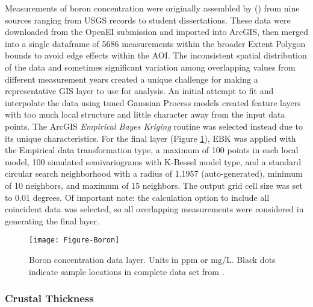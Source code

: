 Measurements of boron concentration were originally assembled by \citeauthor{bielicki_hydrogeolgic_2015} (\citeyear{bielicki_hydrogeolgic_2015}) from nine sources ranging from USGS records to student dissertations. These data were downloaded from the OpenEI submission \citep{kelley_geothermal_2015} and imported into ArcGIS, then merged into a single dataframe of 5686 measurements within the broader Extent Polygon bounds to avoid edge effects within the AOI. The inconsistent spatial distribution of the data and sometimes significant variation among overlapping values from different measurement years created a unique challenge for making a representative GIS layer to use for analysis. An initial attempt to fit and interpolate the data using tuned Gaussian Process models created feature layers with too much local structure and little character away from the input data points. The ArcGIS \textit{Empirical Bayes Kriging} routine was selected instead due to its unique characteristics. For the final layer (Figure \ref{fig:feat_boron}), EBK was applied with the Empirical data transformation type, a maximum of 100 points in each local model, 100 simulated semivariograms with K-Bessel model type, and a standard circular search neighborhood with a radius of 1.1957 (auto-generated), minimum of 10 neighbors, and maximum of 15 neighbors. The output grid cell size was set to 0.01 degrees. Of important note: the calculation option to include all coincident data was selected, so all overlapping measurements were considered in generating the final layer.

\begin{figure}[h!]
\centering
\texttt{[image: Figure-Boron]}
\caption[Boron concentration data layer]{Boron concentration data layer. Units in ppm or mg/L. Black dots indicate sample locations in complete data set from \protect\citep{bielicki_hydrogeolgic_2015}.}
\label{fig:feat_boron}
\end{figure}

\subsubsection{Crustal Thickness}

